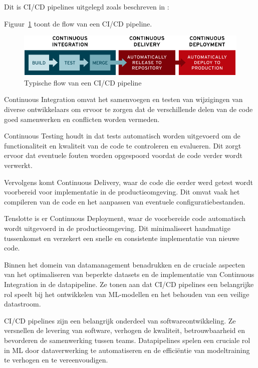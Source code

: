 
Dit is CI/CD pipelines uitgelegd zoals beschreven in \textcite{NaveenVemuri2024}:

Figuur~\ref{fig:CICD_flow} toont de flow van een CI/CD pipeline. 

\begin{figure}
    \includegraphics[width=\linewidth]{graphics/cdci.png}
    \caption{Typische flow van een CI/CD pipeline \autocite{RedHat2023}}
    \label{fig:CICD_flow}
\end{figure}

Continuous Integration omvat het samenvoegen en testen van wijzigingen van diverse ontwikkelaars om ervoor te zorgen dat de verschillende delen van de code goed samenwerken en conflicten worden vermeden.

Continuous Testing houdt in dat tests automatisch worden uitgevoerd om de functionaliteit en kwaliteit van de code te controleren en evalueren. Dit zorgt ervoor dat eventuele fouten worden opgespoord voordat de code verder wordt verwerkt.

Vervolgens komt Continuous Delivery, waar de code die eerder werd getest wordt voorbereid voor implementatie in de productieomgeving. Dit omvat vaak het compileren van de code en het aanpassen van eventuele configuratiebestanden.

Tenslotte is er Continuous Deployment, waar de voorbereide code automatisch wordt uitgevoerd in de productieomgeving. Dit minimaliseert handmatige tussenkomst en verzekert een snelle en consistente implementatie van nieuwe code.\newline


Binnen het domein van datamanagement benadrukken \textcite{Samad2018} en \textcite{Vadavalasa2020} de cruciale aspecten van het optimaliseren van beperkte datasets en de implementatie van Continuous Integration in de datapipeline. Ze tonen aan dat CI/CD pipelines een belangrijke rol speelt bij het ontwikkelen van ML-modellen en het behouden van een veilige datastroom.

CI/CD pipelines zijn een belangrijk onderdeel van softwareontwikkeling. Ze versnellen de levering van software, verhogen de kwaliteit, betrouwbaarheid en bevorderen de samenwerking tussen teams. Datapipelines spelen een cruciale rol in ML door dataverwerking te automatiseren en de efficiëntie van modeltraining te verhogen en te vereenvoudigen.
